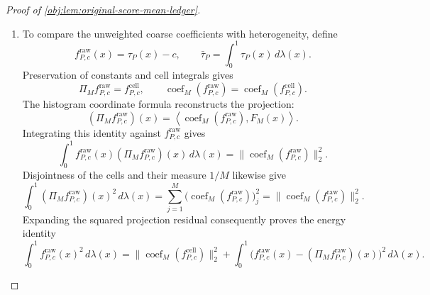 \documentclass[11pt]{article}
\begin{document}
\begin{proof}[Proof of \cref{obj:lem:original-score-mean-ledger}]
\begin{enumerate}
Define the coarse-cell average weights by
\[
\bar w_{j,M}
=
M\int_{I_{j,M}}w_K(x)\,d\lambda(x),
\qquad j\in\{1,\ldots,M\}.
\]
The function \(f^{\mathrm{cell}}_{P,c}\) is constant on each coarse cell, so the coordinate formula gives
\[
\bigl(\theta^{\mathrm{cell}}_P(c)\bigr)_j
=
\bar w_{j,M}
\bigl(\operatorname{coef}_M(f^{\mathrm{cell}}_{P,c})\bigr)_j,
\qquad
\bar w_{j,M}\ge\frac3{16}.
\]
Squaring and summing proves
\[
\|\theta^{\mathrm{cell}}_P(c)\|_2^2
\ge
\left(\frac3{16}\right)^2
\|\operatorname{coef}_M(f^{\mathrm{cell}}_{P,c})\|_2^2,
\]
and therefore
\[
\|\theta^{\mathrm{cell}}_P(c)\|_2
\ge
\frac3{16}
\|\operatorname{coef}_M(f^{\mathrm{cell}}_{P,c})\|_2.
\]
The effect cap in \cref{obj:ass:effect-cap} also gives the bounds used to integrate these vectors:
\[
|\Pi_M\tau_P|\le\frac12,
\qquad
|f^{\mathrm{cell}}_{P,c}|\le1,
\qquad
|\tau_P-c|\le1.
\]

\item
To compare the unweighted coarse coefficients with heterogeneity, define
\[
f^{\mathrm{raw}}_{P,c}(x)=\tau_P(x)-c,
\qquad
\bar\tau_P=\int_0^1\tau_P(x)\,d\lambda(x).
\]
Preservation of constants and cell integrals gives
\[
\Pi_Mf^{\mathrm{raw}}_{P,c}=f^{\mathrm{cell}}_{P,c},
\qquad
\operatorname{coef}_M(f^{\mathrm{raw}}_{P,c})
=
\operatorname{coef}_M(f^{\mathrm{cell}}_{P,c}).
\]
The histogram coordinate formula reconstructs the projection:
\[
(\Pi_Mf^{\mathrm{raw}}_{P,c})(x)
=
\left\langle
\operatorname{coef}_M(f^{\mathrm{raw}}_{P,c}),F_M(x)
\right\rangle.
\]
Integrating this identity against \(f^{\mathrm{raw}}_{P,c}\) gives
\[
\int_0^1
f^{\mathrm{raw}}_{P,c}(x)(\Pi_Mf^{\mathrm{raw}}_{P,c})(x)\,d\lambda(x)
=
\|\operatorname{coef}_M(f^{\mathrm{raw}}_{P,c})\|_2^2.
\]
Disjointness of the cells and their measure \(1/M\) likewise give
\[
\int_0^1(\Pi_Mf^{\mathrm{raw}}_{P,c})(x)^2\,d\lambda(x)
=
\sum_{j=1}^M
\bigl(\operatorname{coef}_M(f^{\mathrm{raw}}_{P,c})\bigr)_j^2
=
\|\operatorname{coef}_M(f^{\mathrm{raw}}_{P,c})\|_2^2.
\]
Expanding the squared projection residual consequently proves the energy identity
\[
\int_0^1f^{\mathrm{raw}}_{P,c}(x)^2\,d\lambda(x)
=
\|\operatorname{coef}_M(f^{\mathrm{cell}}_{P,c})\|_2^2
+
\int_0^1
\bigl(f^{\mathrm{raw}}_{P,c}(x)-(\Pi_Mf^{\mathrm{raw}}_{P,c})(x)\bigr)^2
\,d\lambda(x).
\]


\end{enumerate}
\end{proof}
\end{document}

